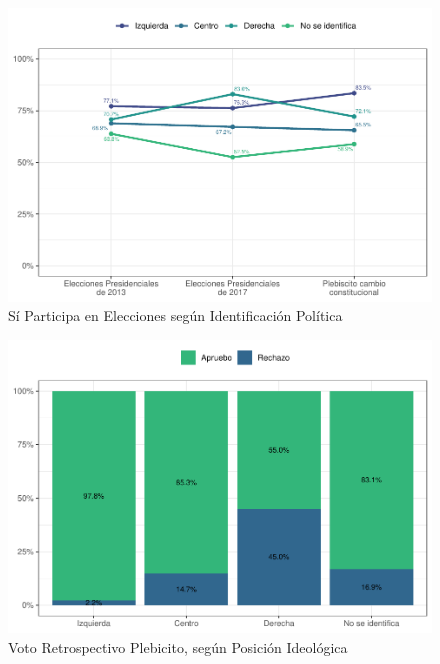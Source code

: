 \documentclass[
  12pt,
]{book}
\begin{document}
\begin{figure}

{\centering \includegraphics{reporte-elsoc_files/figure-latex/particip-elect-id-1} 

}

\caption{Sí Participa en Elecciones según Identificación Política}\label{fig:particip-elect-id}
\end{figure}

\begin{figure}

{\centering \includegraphics{reporte-elsoc_files/figure-latex/id-pol-voto-1} 

}

\caption{Voto Retrospectivo Plebicito, según Posición Ideológica}\label{fig:id-pol-voto}
\end{figure}
\end{document}

